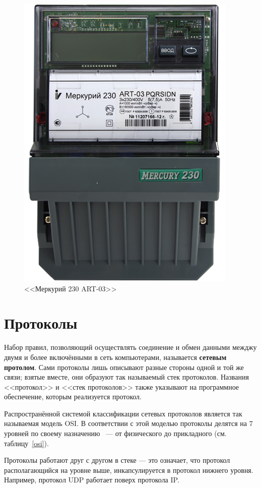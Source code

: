 \documentclass[utf8,14pt, coursreport]{G7-32}
\begin{document}
\begin{figure}[h]
	\label{mercury}
	\centering
		\includegraphics[scale=0.6]{img/mercury.png}
	\caption{<<Меркурий 230 ART-03>>}
\end{figure}

\newpage

\section{Протоколы}

Набор правил, позволяющий осуществлять соединение и обмен данными межджу двумя и более включёнными в сеть компьютерами, называется \textbf{сетевым протолом}.
Сами протоколы лишь описывают разные стороны одной и той же связи; взятые вместе, они образуют так называемый стек протоколов. Названия <<протокол>> и <<стек протоколов>> также указывают на программное обеспечение, которым реализуется протокол\cite{protocols}.

Распространённой системой классификации сетевых протоколов является так называемая модель OSI. В соответствии с этой моделью протоколы делятся на 7 уровней по своему назначению ~--- от физического до прикладного (см. таблицу~\ref{osi}). 

Протоколы работают друг с другом в стеке --- это означает, что протокол располагающийся на уровне выше, инкапсулируется в протокол нижнего уровня. Например, протокол UDP работает поверх протокола IP.
\end{document}
